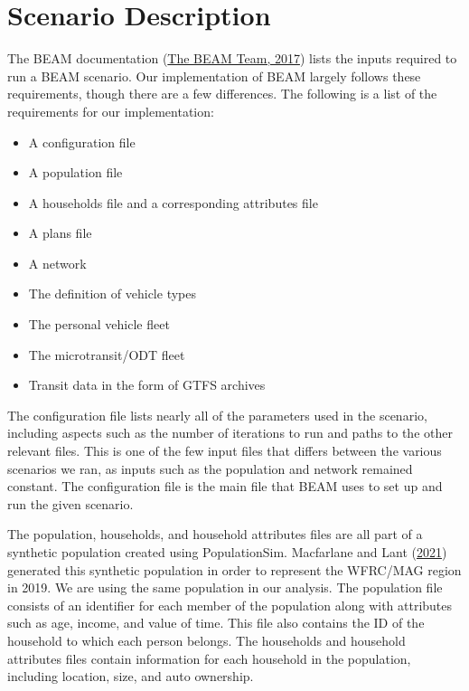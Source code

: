 \documentclass[
]{report}
\providecommand{\tightlist}{%
  \setlength{\itemsep}{0pt}\setlength{\parskip}{0pt}}
\begin{document}
\hypertarget{scenario-description}{%
\section{Scenario Description}\label{scenario-description}}

The BEAM documentation (\protect\hyperlink{ref-beamdocs}{The BEAM Team, 2017}) lists the inputs required to run a BEAM scenario. Our implementation of BEAM largely follows these requirements, though there are a few differences. The following is a list of the requirements for our implementation:

\begin{itemize}
\tightlist
\item
  A configuration file
\item
  A population file
\item
  A households file and a corresponding attributes file
\item
  A plans file
\item
  A network
\item
  The definition of vehicle types
\item
  The personal vehicle fleet
\item
  The microtransit/ODT fleet
\item
  Transit data in the form of GTFS archives
\end{itemize}

The configuration file lists nearly all of the parameters used in the scenario, including aspects such as the number of iterations to run and paths to the other relevant files. This is one of the few input files that differs between the various scenarios we ran, as inputs such as the population and network remained constant. The configuration file is the main file that BEAM uses to set up and run the given scenario.

The population, households, and household attributes files are all part of a synthetic population created using PopulationSim. Macfarlane and Lant (\protect\hyperlink{ref-MacfarlaneLant}{2021}) generated this synthetic population in order to represent the WFRC/MAG region in 2019. We are using the same population in our analysis. The population file consists of an identifier for each member of the population along with attributes such as age, income, and value of time. This file also contains the ID of the household to which each person belongs. The households and household attributes files contain information for each household in the population, including location, size, and auto ownership.
\end{document}
